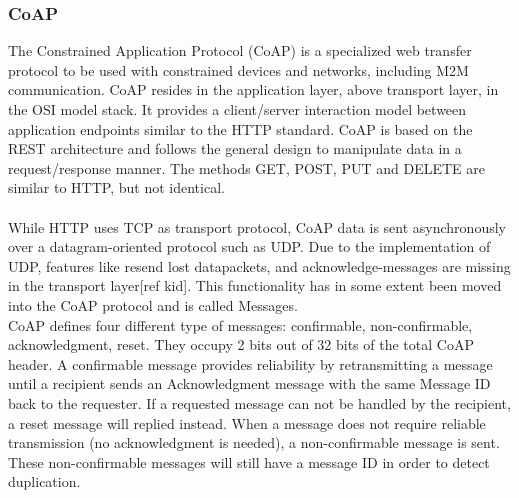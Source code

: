 \subsubsection{CoAP}
The Constrained Application Protocol (CoAP) is a specialized web transfer protocol to be used with constrained devices and networks, including M2M communication\cite{rfc7959}. CoAP resides in the application layer, above transport layer, in the OSI model stack.
It provides a client/server interaction model between application endpoints similar to the HTTP standard. 
CoAP is based on the REST architecture and follows the general design to manipulate data in a request/response manner. The methods GET, POST, PUT and DELETE are similar to HTTP, but not identical.
\\\\
While HTTP uses TCP as transport protocol, CoAP data is sent asynchronously over a datagram-oriented protocol such as UDP. Due to the implementation of UDP, features like resend lost datapackets, and acknowledge-messages are missing in the transport layer[ref kid]. This functionality has in some extent been moved into the CoAP protocol and is called Messages. \\
CoAP defines four different type of messages: confirmable, non-confirmable, acknowledgment, reset. They occupy 2 bits out of 32 bits of the total CoAP header.
A confirmable message provides reliability by retransmitting a message until a recipient sends an Acknowledgment message with the same Message ID back to the requester. If a requested message can not be handled by the recipient, a reset message will replied instead. When a message does not require reliable transmission (no acknowledgment is needed), a non-confirmable message is sent. These non-confirmable messages will still have a message ID in order to detect duplication.













